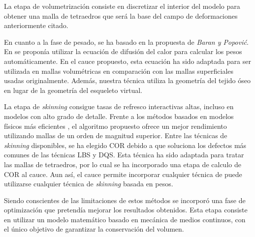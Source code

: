 La etapa de volumetrización consiste en discretizar el interior del modelo para obtener una malla de tetraedros que será la base del campo de deformaciones anteriormente citado.

En cuanto a la fase de pesado, se ha basado en la propuesta de \emph{Baran y Popovi\'{c}}. En \cite{Baran:2007} se proponía utilizar la ecuación de difusión del calor para calcular los pesos automáticamente. En el cauce propuesto, esta ecuación ha sido adaptada para ser utilizada en mallas volumétricas en comparación con las mallas superficiales usadas originalmente. Además, nuestra técnica utiliza la geometría del tejido óseo en lugar de la geometría del esqueleto virtual.

La etapa de \emph{skinning} consigue tasas de refresco interactivas altas, incluso en modelos con alto grado de detalle. Frente a los métodos basados en modelos físicos más eficientes \cite{Bender:2014}, el algoritmo propuesto ofrece un mejor rendimiento utilizando mallas de un orden de magnitud superior. Entre las técnicas de \emph{skinning} disponibles, se ha elegido \ac{COR} \cite{le2016real} debido a que soluciona los defectos más comunes de las técnicas \ac{LBS}\cite{thalmann88} y \ac{DQS}\cite{Kavan2008}. Esta técnica ha sido adaptada para tratar las mallas de tetraedros, por lo cual se ha incorporado una etapa de calculo de \acl{COR} al cauce. Aun así, el cauce permite incorporar cualquier técnica de 
puede utilizarse cualquier técnica de \emph{skinning} basada en pesos.


Siendo conscientes de las limitaciones de estos métodos %
se incorporó una fase de optimización que pretendía mejorar los resultados obtenidos. Esta etapa consiste en utilizar un modelo matemático basado en mecánica de medios continuos, con el único objetivo de garantizar la conservación del volumen.

